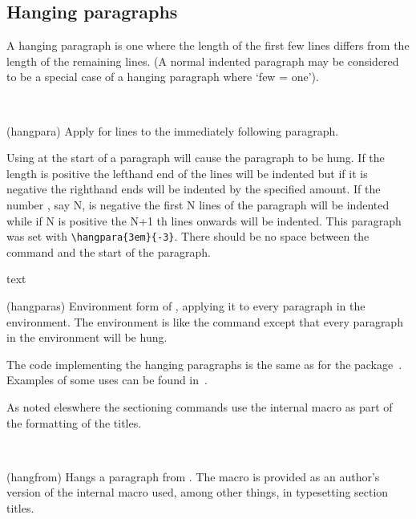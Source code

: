 \subsection{Hanging paragraphs}


    A hanging paragraph is one where the length of the first few lines differs
from the length of the remaining lines. (A normal indented paragraph 
may be considered 
to be a special case of a hanging paragraph where `few = one'). 

\begin{syntax}
\cmd{\hangpara} \\
\end{syntax}
\glossary(hangpara)%
  {}%
  {Apply  for  lines to the immediately following 
   paragraph.}

%
 Using \cmd{\hangpara} at the start of a paragraph will cause the paragraph
to be hung. If the length  is positive the lefthand end of the 
lines will be indented but if it is negative the righthand ends will be 
indented by the specified amount.
    If the number , say N, is negative the first N lines of
the paragraph will be indented while if N is positive the N+1 th lines onwards
will be indented. This paragraph was set with \verb?\hangpara{3em}{-3}?. There 
should be no space between the \cmd{\hangpara} command and the start of the
paragraph.

\begin{syntax}
 text  \\
\end{syntax}
\glossary(hangparas)%
  {}%
  {Environment form of , applying it to every paragraph in the
   environment.}
    The  environment is like the \cmd{\hangpara} command except
that every paragraph in the environment will be hung.

    The code implementing the hanging paragraphs is the same as for
the  package~\cite{HANGING}. Examples of some uses
can be found in~\cite{TTC199}.

    As noted eleswhere the sectioning commands use the internal 
macro \cmd{\@hangfrom} as part of the formatting of the titles.

\begin{syntax}
\cmd{\hangfrom} \\
\end{syntax}
\glossary(hangfrom)%
  {}%
  {Hangs a paragraph from .}
The \cmd{\hangfrom} macro is provided as an author's version of the
internal \cmd{\@hangfrom} macro used, among other things, in typesetting 
section titles.

